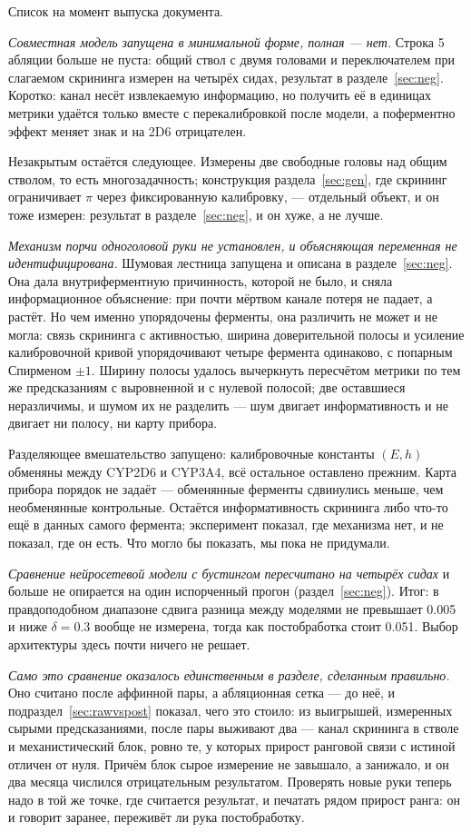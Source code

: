Список на момент выпуска документа.

\emph{Совместная модель запущена в минимальной форме, полная --- нет.} Строка 5 абляции больше
не пуста: общий ствол с двумя головами и переключателем при слагаемом скрининга измерен на четырёх
сидах, результат в разделе~\ref{sec:neg}. Коротко: канал несёт извлекаемую информацию, но
получить её в единицах метрики удаётся только вместе с перекалибровкой после модели, а
поферментно эффект меняет знак и на 2D6 отрицателен.

Незакрытым остаётся следующее. Измерены две свободные головы над общим стволом, то есть
многозадачность; конструкция раздела~\ref{sec:gen}, где скрининг ограничивает $\pi$ через
фиксированную калибровку, --- отдельный объект, и он тоже измерен: результат в
разделе~\ref{sec:neg}, и он хуже, а не лучше.

\emph{Механизм порчи одноголовой руки не установлен, и объясняющая переменная не
идентифицирована.} Шумовая лестница запущена и описана в разделе~\ref{sec:neg}. Она дала
внутрифермент\-ную причинность, которой не было, и сняла информационное объяснение: при почти
мёртвом канале потеря не падает, а растёт. Но чем именно упорядочены ферменты, она различить
не может и не могла: связь скрининга с активностью, ширина доверительной полосы и усиление
калибровочной кривой упорядочивают четыре фермента одинаково, с попарным Спирменом $\pm 1$.
Ширину полосы удалось вычеркнуть пересчётом метрики по тем же предсказаниям с выровненной и с
нулевой полосой; две оставшиеся неразличимы, и шумом их не разделить --- шум двигает
информативность и не двигает ни полосу, ни карту прибора.

Разделяющее вмешательство запущено: калибровочные константы $(E, h)$ обменяны между CYP2D6 и
CYP3A4, всё остальное оставлено прежним. Карта прибора порядок не задаёт --- обменянные
ферменты сдвинулись меньше, чем необменянные контрольные. Остаётся информативность скрининга
либо что-то ещё в данных самого фермента; эксперимент показал, где механизма нет, и не
показал, где он есть. Что могло бы показать, мы пока не придумали.

\emph{Сравнение нейросетевой модели с бустингом пересчитано на четырёх сидах} и больше не
опирается на один испорченный прогон (раздел~\ref{sec:neg}). Итог: в правдоподобном диапазоне
сдвига разница между моделями не превышает 0.005 и ниже $\delta = 0.3$ вообще не измерена,
тогда как постобработка стоит 0.051. Выбор архитектуры здесь почти ничего не решает.

\emph{Само это сравнение оказалось единственным в разделе, сделанным правильно.} Оно считано
после аффинной пары, а абляционная сетка --- до неё, и подраздел~\ref{sec:rawvspost} показал,
чего это стоило: из выигрышей, измеренных сырыми предсказаниями, после пары выживают два ---
канал скрининга в стволе и механистический блок, ровно те, у которых прирост ранговой связи с
истиной отличен от нуля. Причём блок сырое измерение не завышало, а занижало, и он два месяца
числился отрицательным результатом. Проверять новые руки теперь надо в той же точке, где считается результат, и
печатать рядом прирост ранга: он и говорит заранее, переживёт ли рука постобработку.

